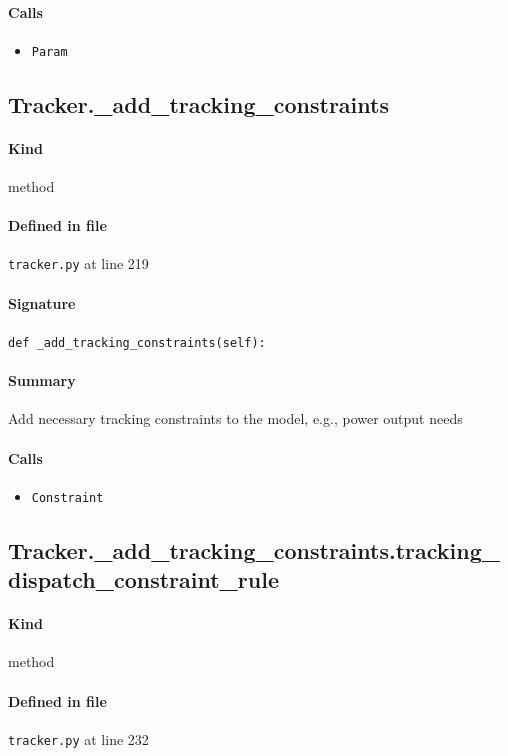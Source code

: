 \documentclass[11pt]{report}
\begin{document}
\paragraph{Calls}
\begin{itemize}[leftmargin=*]
  \item \texttt{Param}
\end{itemize}
\subsection{Tracker.\_add\_tracking\_constraints}
\label{def:tracker.py:Tracker._add_tracking_constraints:L219}
\paragraph{Kind} method
\paragraph{Defined in file} \texttt{tracker.py} at line 219
\paragraph{Signature} \texttt{def \_add\_tracking\_constraints(self):}
\paragraph{Summary} Add necessary tracking constraints to the model, e.g., power output needs
\paragraph{Calls}
\begin{itemize}[leftmargin=*]
  \item \texttt{Constraint}
\end{itemize}
\subsection{Tracker.\_add\_tracking\_constraints.tracking\_dispatch\_constraint\_rule}
\label{def:tracker.py:Tracker._add_tracking_constraints.tracking_dispatch_constraint_rule:L232}
\paragraph{Kind} method
\paragraph{Defined in file} \texttt{tracker.py} at line 232
\end{document}
